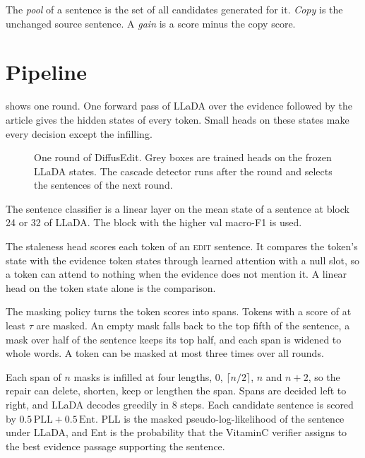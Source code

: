 \documentclass[]{paper}
\newcommand{\edit}{\textsc{edit}}
\begin{document}
The \emph{pool} of a sentence is the set of all candidates generated for it. \emph{Copy} is the unchanged source sentence. A \emph{gain} is a score minus the copy score.

\section{Pipeline}
\label{sec:pipeline}

 shows one round. One forward pass of LLaDA over the evidence followed by the article gives the hidden states of every token. Small heads on these states make every decision except the infilling.

\begin{figure}[t]
\centering

\caption{One round of DiffusEdit. Grey boxes are trained heads on the frozen LLaDA states. The cascade detector runs after the round and selects the sentences of the next round.}
\label{fig:pipeline}
\end{figure}

The sentence classifier is a linear layer on the mean state of a sentence at block 24 or 32 of LLaDA\@. The block with the higher val macro-F1 is used.

The staleness head scores each token of an \edit{} sentence. It compares the token's state with the evidence token states through learned attention with a null slot, so a token can attend to nothing when the evidence does not mention it. A linear head on the token state alone is the comparison.

The masking policy turns the token scores into spans. Tokens with a score of at least $\tau$ are masked. An empty mask falls back to the top fifth of the sentence, a mask over half of the sentence keeps its top half, and each span is widened to whole words. A token can be masked at most three times over all rounds.

Each span of $n$ masks is infilled at four lengths, $0$, $\lceil n/2 \rceil$, $n$ and $n+2$, so the repair can delete, shorten, keep or lengthen the span. Spans are decided left to right, and LLaDA decodes greedily in 8 steps. Each candidate sentence is scored by $0.5\,\mathrm{PLL} + 0.5\,\mathrm{Ent}$. PLL is the masked pseudo-log-likelihood of the sentence under LLaDA, and Ent is the probability that the VitaminC verifier \citep{schuster-etal-2021-vitaminc} assigns to the best evidence passage supporting the sentence.
\end{document}
